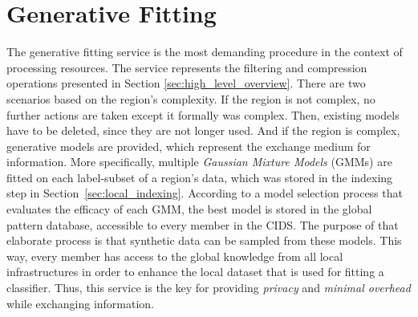 \section{Generative Fitting} \label{sec:generative_fitting}

The generative fitting service is the most demanding procedure in the context of processing resources. The service represents the filtering and compression operations presented in Section \ref{sec:high_level_overview}. There are two scenarios based on the region's complexity. If the region is not complex, no further actions are taken except it formally was complex. Then, existing models have to be deleted, since they are not longer used. And if the region is complex, generative models are provided, which represent the exchange medium for information. More specifically, multiple \textit{Gaussian Mixture Models} (GMMs) are fitted on each label-subset of a region's data, which was stored in the indexing step in Section~\ref{sec:local_indexing}. According to a model selection process that evaluates the efficacy of each GMM, the best model is stored in the global pattern database, accessible to every member in the CIDS. The purpose of that elaborate process is that synthetic data can be sampled from these models. This way, every member has access to the global knowledge from all local infrastructures in order to enhance the local dataset that is used for fitting a classifier. Thus, this service is the key for providing \textit{privacy} and \textit{minimal overhead} while exchanging information.
